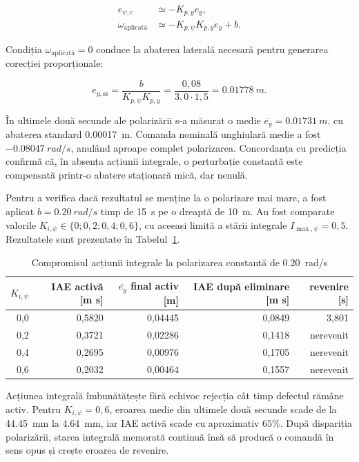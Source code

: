 \documentclass[12pt,a4paper,oneside]{report}
\begin{document}
\begin{align}
  e_{\psi,c} &\simeq -K_{p,y}e_y, \\
  \omega_{\mathrm{aplicată}} &\simeq
    -K_{p,\psi}K_{p,y}e_y+b.
\end{align}

Condiția $\omega_{\mathrm{aplicată}}=0$ conduce la abaterea laterală necesară
pentru generarea corecției proporționale:

\begin{equation}
  e_{y,\mathrm{ss}}=\frac{b}{K_{p,\psi}K_{p,y}}
  =\frac{0{,}08}{3{,}0\cdot1{,}5}=\SI{0.01778}{m}.
\end{equation}

În ultimele două secunde ale polarizării s-a măsurat o medie
$\overline{e_y}=\SI{0.01731}{m}$, cu abaterea standard
\SI{0.00017}{m}. Comanda nominală unghiulară medie a fost
$-\SI{0.08047}{rad/s}$, anulând aproape complet polarizarea. Concordanța cu
predicția confirmă că, în absența acțiunii integrale, o perturbație constantă
este compensată printr-o abatere staționară mică, dar nenulă.

Pentru a verifica dacă rezultatul se menține la o polarizare mai mare, a fost
aplicat $b=\SI{0.20}{rad/s}$ timp de \SI{15}{s} pe o dreaptă de \SI{10}{m}.
Au fost comparate valorile $K_{i,\psi}\in\{0;0{,}2;0{,}4;0{,}6\}$, cu aceeași
limită a stării integrale $I_{\max,\psi}=0{,}5$. Rezultatele sunt prezentate în
Tabelul~\ref{tab:integral-constant-bias}.

\begin{table}[htbp]
  \centering
  \caption{Compromisul acțiunii integrale la polarizarea constantă de
  \SI{0.20}{rad/s}}
  \label{tab:integral-constant-bias}
  \begin{tabular}{rrrrr}
    \toprule
    $K_{i,\psi}$ & IAE activă [m s] & $\overline{e_y}$ final activ [m]
      & IAE după eliminare [m s] & revenire [s] \\
    \midrule
    0,0 & 0,5820 & 0,04445 & 0,0849 & 3,801 \\
    0,2 & 0,3721 & 0,02286 & 0,1418 & nerevenit \\
    0,4 & 0,2695 & 0,00976 & 0,1705 & nerevenit \\
    0,6 & 0,2032 & 0,00464 & 0,1557 & nerevenit \\
    \bottomrule
  \end{tabular}
\end{table}

Acțiunea integrală îmbunătățește fără echivoc rejecția cât timp defectul rămâne
activ. Pentru $K_{i,\psi}=0{,}6$, eroarea medie din ultimele două secunde scade
de la \SI{44.45}{mm} la \SI{4.64}{mm}, iar IAE activă scade cu aproximativ
$65\%$. După dispariția polarizării, starea integrală memorată continuă însă să
producă o comandă în sens opus și crește eroarea de revenire.
\end{document}
